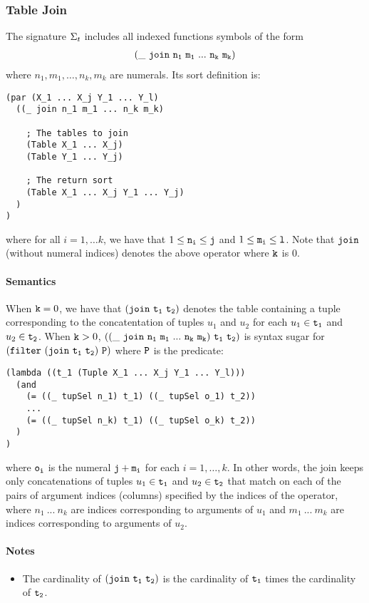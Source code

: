 \documentclass[english,a4paper,10pt]{article}
\begin{document}
\subsubsection{Table Join}
The signature $\Sigma_{t}$ includes 
all indexed functions symbols of the form
\begin{align*}
{\tt  
(\_\ join\ n_1\ m_1\ ...\ n_k\ m_k)
}
\end{align*}
where $n_1, m_1, \ldots, n_k, m_k$ are numerals.
Its sort definition is:

\begin{verbatim}
(par (X_1 ... X_j Y_1 ... Y_l)
  ((_ join n_1 m_1 ... n_k m_k)
  
    ; The tables to join
    (Table X_1 ... X_j)
    (Table Y_1 ... Y_j)
    
    ; The return sort
    (Table X_1 ... X_j Y_1 ... Y_j)
  )
)
\end{verbatim}
where for all $i = 1, \ldots k$,
we have that $1 \leq {\tt n_i} \leq {\tt j}$ and $1 \leq {\tt m_i} \leq {\tt l}$. 
Note that
${\tt join}$ (without numeral indices) denotes the above operator where ${\tt k}$ is $0$.

\paragraph{Semantics}
When ${\tt k}=0$, we have that $\syntax{(join\ t_1\ t_2)}$
denotes the table containing a tuple corresponding to the concatentation
of tuples $u_1$ and $u_2$
for each $u_1 \in {\tt t_1}$ and $u_2 \in {\tt t_2}$.
When ${\tt k}>0$, $\syntax{((\_\ join\ n_1\ m_1\ ...\ n_k\ m_k)\ t_1\ t_2)}$
is syntax sugar for ${\tt (filter\ (join\ t_1\ t_2)\ P)}$ where ${\tt P}$ is
the predicate:
\begin{verbatim}
(lambda ((t_1 (Tuple X_1 ... X_j Y_1 ... Y_l)))
  (and
    (= ((_ tupSel n_1) t_1) ((_ tupSel o_1) t_2))
    ...
    (= ((_ tupSel n_k) t_1) ((_ tupSel o_k) t_2))
  )
)
\end{verbatim}
where ${\tt o_i}$ is the numeral ${\tt j+m_i}$ for each $i = 1, \ldots, k$.
In other words,
the join keeps only concatenations of tuples $u_1 \in {\tt t_1}$ and
$u_2 \in {\tt t_2}$ 
that match on each of the pairs of argument indices (columns) specified by
the indices of the operator,
where $n_1\ ...\ n_k$ are indices corresponding to arguments of $u_1$
and $m_1\ ...\ m_k$ are indices corresponding to arguments of $u_2$.

\paragraph{Notes}
\begin{itemize}
\item The cardinality of $\syntax{(join\ t_1\ t_2)}$
is the cardinality of ${\tt t_1}$ times the cardinality of ${\tt t_2}$.
\end{itemize}
\end{document}
